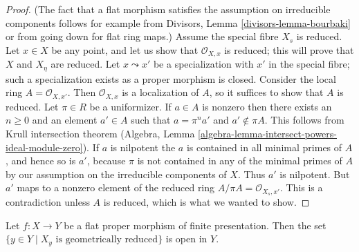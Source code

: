 \begin{proof}
(The fact that a flat morphism satisfies the assumption on irreducible
components follows for example from
Divisors, Lemma \ref{divisors-lemma-bourbaki}
or from going down for flat ring maps.)
Assume the special fibre $X_s$ is reduced.
Let $x \in X$ be any point, and let us show that $\mathcal{O}_{X, x}$
is reduced; this will prove that $X$ and $X_\eta$ are reduced.
Let $x \leadsto x'$ be a specialization with $x'$
in the special fibre; such a specialization exists
as a proper morphism is closed. Consider the local
ring $A = \mathcal{O}_{X, x'}$. Then $\mathcal{O}_{X, x}$
is a localization of $A$, so it suffices to show that
$A$ is reduced. Let $\pi \in R$ be a uniformizer.
If $a \in A$ is nonzero then there exists an $n \geq 0$ and an element
$a' \in A$ such that $a = \pi^n a'$ and $a' \not \in \pi A$.
This follows from Krull intersection theorem
(Algebra, Lemma \ref{algebra-lemma-intersect-powers-ideal-module-zero}).
If $a$ is nilpotent the $a$ is contained in all minimal primes of $A$,
and hence so is $a'$, because $\pi$ is not contained in any
of the minimal primes of $A$ by our assumption on the irreducible
components of $X$. Thus $a'$ is nilpotent.
But $a'$ maps to a nonzero element of the reduced ring
$A/\pi A = \mathcal{O}_{X_s, x'}$.
This is a contradiction unless $A$ is reduced, which
is what we wanted to show.
\end{proof}

\begin{lemma}
\label{lemma-geometrically-reduced-open}
Let $f : X \to Y$ be a flat proper morphism of finite presentation.
Then the set $\{y \in Y \mid X_y\text{ is geometrically reduced}\}$
is open in $Y$.
\end{lemma}

